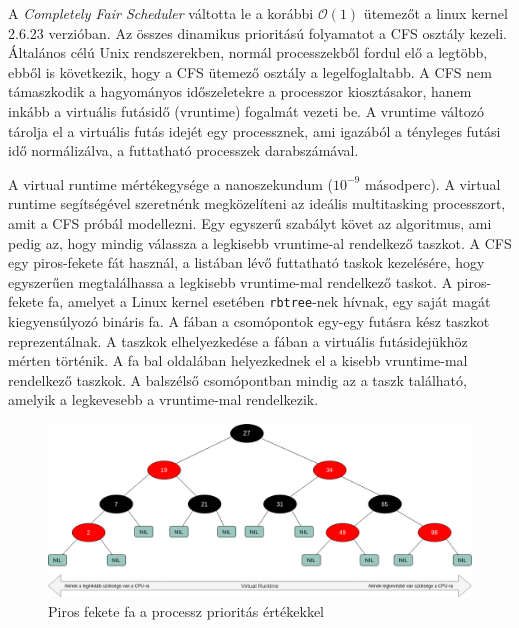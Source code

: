 
\label{sec:cfs}

A \textit{Completely Fair Scheduler} váltotta le a korábbi $\mathcal{O}(1)$ ütemezőt a linux kernel 2.6.23 verzióban.
Az összes dinamikus prioritású folyamatot a CFS osztály kezeli. Általános célú Unix rendszerekben, normál processzekből fordul elő a legtöbb, ebből is következik, hogy a CFS ütemező osztály a legelfoglaltabb.
A CFS nem támaszkodik a hagyományos időszeletekre a processzor kiosztásakor, hanem inkább a virtuális futásidő (vruntime) fogalmát vezeti be.
A vruntime változó tárolja el a virtuális futás idejét egy processznek, ami igazából a tényleges futási idő normálizálva, a futtatható processzek darabszámával.

A virtual runtime mértékegysége a nanoszekundum ($10^{-9}$ másodperc).
A virtual runtime segítségével szeretnénk megközelíteni az ideális multitasking processzort, amit a CFS próbál modellezni. Egy egyszerű szabályt követ az algoritmus, ami pedig az, hogy mindig válassza a legkisebb vruntime-al rendelkező taszkot. A CFS egy piros-fekete fát használ, a listában lévő futtatható taskok kezelésére, hogy egyszerűen megtalálhassa a legkisebb vruntime-mal rendelkező taskot.
A piros-fekete fa, amelyet a Linux kernel esetében \texttt{rbtree}-nek hívnak, egy saját magát kiegyensúlyozó bináris fa.
A fában a csomópontok egy-egy futásra kész taszkot reprezentálnak. A taszkok elhelyezkedése a fában a virtuális futásidejükhöz mérten történik. 
A fa bal oldalában helyezkednek el a kisebb vruntime-mal rendelkező taszkok.
A balszélső csomópontban mindig az a taszk található, amelyik a legkevesebb a vruntime-mal rendelkezik.
\begin{figure}[h]
\centering
\includegraphics[width=\textwidth]{images/redBlackTree.png}
\caption{Piros fekete fa a processz prioritás értékekkel}
\label{fig:rb_tree}
\end{figure}

